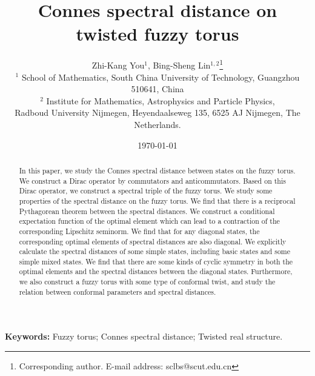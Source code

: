 \documentclass[a4paper,11pt]{article}
\begin{document}
	
	
\title{Connes spectral distance on twisted fuzzy torus}
	
\author{Zhi-Kang You$^1$, Bing-Sheng Lin$^{1,2}$\thanks{Corresponding author. 
	E-mail address: sclbs@scut.edu.cn}\\
	\small $^{1}$ School of Mathematics, South China University of Technology,
	Guangzhou 510641, China\\
	\small $^{2}$ Institute for Mathematics, Astrophysics and Particle Physics,\\
	\small  Radboud University Nijmegen, Heyendaalseweg 135, 6525 AJ Nijmegen, The Netherlands.
}
	
	
\date{\today}
	
	
\maketitle
	
\begin{abstract}
In this paper, we study the Connes spectral distance between states on the fuzzy torus. We construct a Dirac operator by commutators and anticommutators. Based on this Dirac operator, we construct a spectral triple of the fuzzy torus.
We study some properties of the spectral distance on the fuzzy torus. We find that there is a reciprocal Pythagorean theorem between the spectral distances.
We construct a conditional expectation function of the optimal element which can lead to a contraction of the corresponding Lipschitz seminorm. We find that for any diagonal states, the corresponding optimal elements of spectral distances are also diagonal.
We explicitly calculate the spectral distances of some simple states, including basic states and some simple mixed states. We find that there are some kinds of cyclic symmetry in both the optimal elements and the spectral distances between the diagonal states.
Furthermore, we also construct a fuzzy torus with some type of conformal twist, and study the relation between conformal parameters and spectral distances.
\end{abstract}
	
	
\textbf{Keywords:} Fuzzy torus; Connes spectral distance; Twisted real structure.
	
\end{document}
